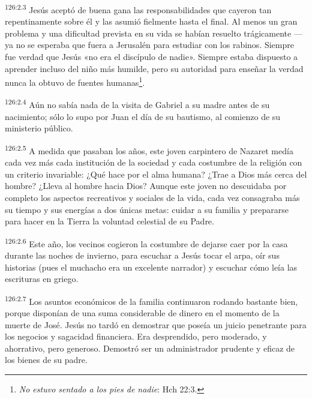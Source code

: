 \par 
\textsuperscript{126:2.3} Jesús aceptó de buena gana las responsabilidades que cayeron tan repentinamente sobre él y las asumió fielmente hasta el final. Al menos un gran problema y una dificultad prevista en su vida se habían resuelto trágicamente ---ya no se esperaba que fuera a Jerusalén para estudiar con los rabinos. Siempre fue verdad que Jesús «no era el discípulo de nadie». Siempre estaba dispuesto a aprender incluso del niño más humilde, pero su autoridad para enseñar la verdad nunca la obtuvo de fuentes humanas\footnote{\textit{No estuvo sentado a los pies de nadie}: Hch 22:3.}.

\par 
\textsuperscript{126:2.4} Aún no sabía nada de la visita de Gabriel a su madre antes de su nacimiento; sólo lo supo por Juan el día de su bautismo, al comienzo de su ministerio público.

\par 
\textsuperscript{126:2.5} A medida que pasaban los años, este joven carpintero de Nazaret medía cada vez más cada institución de la sociedad y cada costumbre de la religión con un criterio invariable: ¿Qué hace por el alma humana? ¿Trae a Dios más cerca del hombre? ¿Lleva al hombre hacia Dios? Aunque este joven no descuidaba por completo los aspectos recreativos y sociales de la vida, cada vez consagraba más su tiempo y sus energías a dos únicas metas: cuidar a su familia y prepararse para hacer en la Tierra la voluntad celestial de su Padre.

\par 
\textsuperscript{126:2.6} Este año, los vecinos cogieron la costumbre de dejarse caer por la casa durante las noches de invierno, para escuchar a Jesús tocar el arpa, oír sus historias (pues el muchacho era un excelente narrador) y escuchar cómo leía las escrituras en griego.

\par 
\textsuperscript{126:2.7} Los asuntos económicos de la familia continuaron rodando bastante bien, porque disponían de una suma considerable de dinero en el momento de la muerte de José. Jesús no tardó en demostrar que poseía un juicio penetrante para los negocios y sagacidad financiera. Era desprendido, pero moderado, y ahorrativo, pero generoso. Demostró ser un administrador prudente y eficaz de los bienes de su padre.

